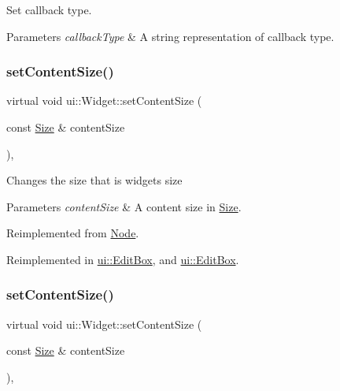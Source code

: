 Set callback type. 
\begin{DoxyParams}{Parameters}
{\em callback\+Type} & A string representation of callback type. \\
\hline
\end{DoxyParams}
\mbox{\label{classui_1_1Widget_af5f35184ff3de275929e937f81a4ae30}} 
\subsubsection{\texorpdfstring{set\+Content\+Size()}{setContentSize()}\hspace{0.1cm}{\footnotesize\ttfamily [1/2]}}
{\footnotesize\ttfamily virtual void ui\+::\+Widget\+::set\+Content\+Size (\begin{DoxyParamCaption}\item[{const \hyperlink{classSize}{Size} \&}]{content\+Size }\end{DoxyParamCaption})\hspace{0.3cm}{\ttfamily [override]}, {\ttfamily [virtual]}}

Changes the size that is widget\textquotesingle{}s size 
\begin{DoxyParams}{Parameters}
{\em content\+Size} & A content size in {\ttfamily \hyperlink{classSize}{Size}}. \\
\hline
\end{DoxyParams}


Reimplemented from \hyperlink{classNode_ade113d7fc9244f58ac98a4712da49818}{Node}.



Reimplemented in \hyperlink{classui_1_1EditBox_a3fbf590dff29ba873d9c72af308f7edd}{ui\+::\+Edit\+Box}, and \hyperlink{classui_1_1EditBox_a1aadf938d146d0469da42e42d33e2a1e}{ui\+::\+Edit\+Box}.

\mbox{\label{classui_1_1Widget_af5f35184ff3de275929e937f81a4ae30}} 
\subsubsection{\texorpdfstring{set\+Content\+Size()}{setContentSize()}\hspace{0.1cm}{\footnotesize\ttfamily [2/2]}}
{\footnotesize\ttfamily virtual void ui\+::\+Widget\+::set\+Content\+Size (\begin{DoxyParamCaption}\item[{const \hyperlink{classSize}{Size} \&}]{content\+Size }\end{DoxyParamCaption})\hspace{0.3cm}{\ttfamily [override]}, {\ttfamily [virtual]}}

